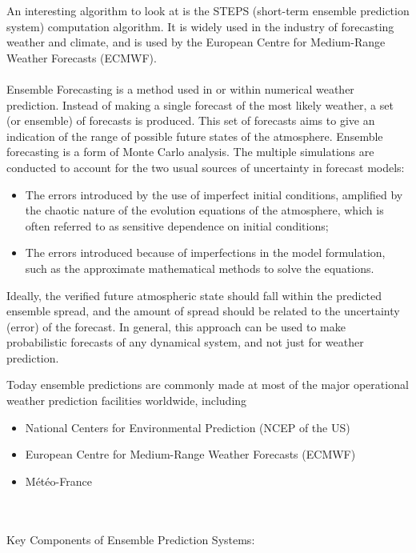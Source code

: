 \documentclass[../paper.tex]{subfiles}
\begin{document}
    An interesting algorithm to look at is the STEPS (short-term ensemble prediction system) computation algorithm.
    It is widely used in the industry of forecasting weather and climate, and is used by the European Centre for Medium-Range Weather Forecasts (ECMWF)\cite{a1, b4}. \\
    \\
    Ensemble Forecasting is a method used in or within numerical weather prediction.
    Instead of making a single forecast of the most likely weather, a set (or ensemble) of forecasts is produced.
    This set of forecasts aims to give an indication of the range of possible future states of the atmosphere.
    Ensemble forecasting is a form of Monte Carlo analysis.
    The multiple simulations are conducted to account for the two usual sources of uncertainty in forecast models:
    \begin{itemize}
        \item The errors introduced by the use of imperfect initial conditions, amplified by the chaotic nature of the evolution equations of the atmosphere, which is often referred to as sensitive dependence on initial conditions;
        \item The errors introduced because of imperfections in the model formulation, such as the approximate mathematical methods to solve the equations.
    \end{itemize}
    Ideally, the verified future atmospheric state should fall within the predicted ensemble spread,
    and the amount of spread should be related to the uncertainty (error) of the forecast.
    In general, this approach can be used to make probabilistic forecasts of any dynamical system,
    and not just for weather prediction\cite{a1}.

    Today ensemble predictions are commonly made at most of the major operational weather prediction facilities worldwide,
    including
    \begin{itemize}
        \item National Centers for Environmental Prediction (NCEP of the US)
        \item European Centre for Medium-Range Weather Forecasts (ECMWF)
        \item M\'et\'eo-France
    \end{itemize}\cite{a1}
    \\\\
    Key Components of Ensemble Prediction Systems:
\end{document}
